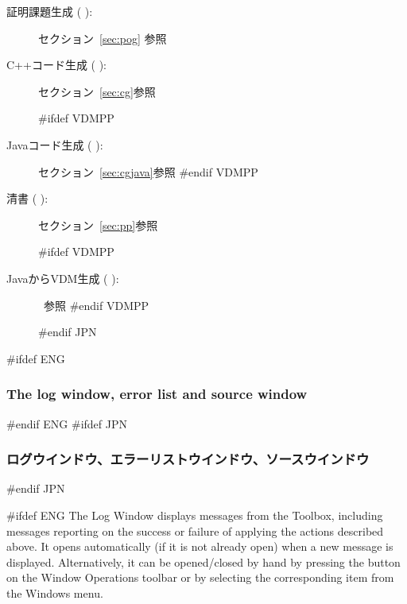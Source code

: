 \documentclass[\pformat,12pt]{article}
\newcommand{\Toolbox}{Toolbox}
\newcommand{\Toolbox}{Toolbox}
\newcommand{\guicmd}[1]{{\sf #1}}
\newcommand{\guicmd}[1]{{\gt #1}}
\begin{document}
\begin{description}
\item[\guicmd{証明課題生成} (\hspace{-1.8mm}
):] セクション~\ref{sec:pog} 参照

\item[\guicmd{C++コード生成} (\hspace{-1.8mm}
):] セクション~\ref{sec:cg}参照 

#ifdef VDMPP
\item[\guicmd{Javaコード生成} (\hspace{-1.8mm}
):] セクション~\ref{sec:cgjava}参照
#endif VDMPP  

\item[\guicmd{清書} (\hspace{-1.8mm}
):] セクション~\ref{sec:pp}参照

#ifdef VDMPP
\item[\guicmd{JavaからVDM生成} (\hspace{-1.8mm}
):] ~\cite{Java2VDMMan-CSK}参照 
#endif VDMPP  

#endif JPN

\end{description}

#ifdef ENG
\subsubsection{The log window, error list and source window}
#endif ENG
#ifdef JPN
\subsubsection{ログウインドウ、エラーリストウインドウ、ソースウインドウ}
#endif JPN

#ifdef ENG
The \guicmd{Log Window} displays messages from the \Toolbox, including
messages reporting on the success or failure of applying the actions
described above. It opens automatically (if it is not already open)
when a new message is displayed. Alternatively, it can be
opened/closed by hand by pressing the 
button on the \guicmd{Window Operations} toolbar or by
selecting the corresponding item from the \guicmd{Windows} menu.
\end{document}
